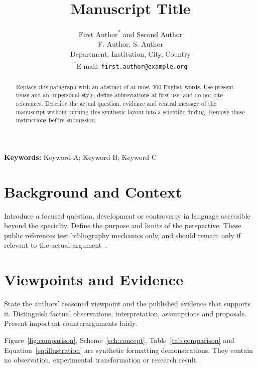 \documentclass[a4paper,11pt]{article}
\title{Manuscript Title}
\author{First Author\textsuperscript{*} and Second Author\\
  \small F. Author, S. Author\\
  \small Department, Institution, City, Country\\
  \small \textsuperscript{*}E-mail: \texttt{first.author@example.org}}
\date{}
\begin{document}
\maketitle
\noindent\textbf{Keywords:} Keyword A; Keyword B; Keyword C

\begin{abstract}
Replace this paragraph with an abstract of at most 200 English words. Use
present tense and an impersonal style, define abbreviations at first use,
and do not cite references. Describe the actual question, evidence and
central message of the manuscript without turning this synthetic layout
into a scientific finding. Remove these instructions before submission.
\end{abstract}

\section{Background and Context}\label{sec:introduction}
Introduce a focused question, development or controversy in language
accessible beyond the specialty. Define the purpose and limits of the
perspective. These public references test bibliography mechanics only,
and should remain only if relevant to the actual
argument~\cite{wilkinson2016fair,peng2011reproducible}.

\section{Viewpoints and Evidence}\label{sec:viewpoint}
State the authors' reasoned viewpoint and the published evidence that
supports it. Distinguish factual observations, interpretation, assumptions
and proposals. Present important counterarguments fairly.

Figure~\ref{fig:comparison}, Scheme~\ref{sch:concept}, Table~\ref{tab:comparison}
and Equation~\eqref{eq:illustration} are synthetic formatting demonstrations.
They contain no observation, experimental transformation or research result.
\end{document}
